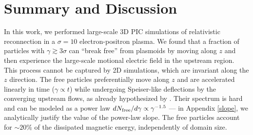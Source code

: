 \documentclass[twocolumn,twocolappendix]{aastex63}
\newcommand{\ls}{\textcolor{teal}}
\newcommand{\comp}{c/\omega_{\rm p}}
\begin{document}

\section{Summary and Discussion}\label{4}
In this work, we performed large-scale 3D PIC simulations of relativistic reconnection in a $\sigma=10$ electron-positron plasma.
We found that a fraction of particles with $\gamma\gtrsim 3\sigma$ can ``break free'' from plasmoids by moving along $z$ and then experience the large-scale motional electric field in the upstream region. This process cannot be captured by 2D simulations, which are invariant along the $z$ direction.
The free particles preferentially move along $z$ and are accelerated linearly in time ($\gamma\propto t$) while undergoing Speiser-like deflections by the converging upstream flows, as already hypothesized by \citet{giannios_10}.
Their spectrum is  hard and can be modeled as a power law $dN_{\rm free}/d\gamma\propto \gamma^{-1.5}$ --- in Appendix \ref{slope}, we analytically justify the value of the power-law slope. The free particles account for $\sim 20\%$ of the dissipated magnetic energy, independently of domain size.
\end{document}
